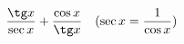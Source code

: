 \begin{ex}[type=expression]
	\begin{condition}
		\( \dfrac{\tg x}{\sec x}+\dfrac{\cos x}{\tg x} \quad (\sec x=\dfrac{1}{\cos x}) \)
	\end{condition}
\end{ex}